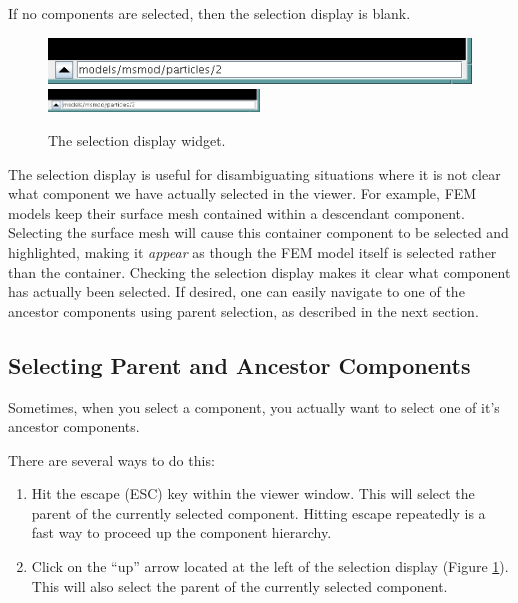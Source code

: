\documentclass{article}
\begin{document}
If no components are selected, then the selection display is blank.

\begin{figure}
\begin{center}
\iflatexml
\includegraphics[]{images/selectionDisplay}
\else
\includegraphics[width=0.50\textwidth]{images/selectionDisplay}
\fi
\end{center}
\caption{The selection display widget.}%
\label{selectionDisplayWidgetFig}
\end{figure}

The selection display is useful for disambiguating situations where it
is not clear what component we have actually selected in the viewer.
For example, FEM models keep their surface mesh contained within a
descendant component. Selecting the surface mesh will cause this
container component to be selected and highlighted, making it {\it
appear} as though the FEM model itself is selected rather than the
container. Checking the selection display makes it clear
what component has actually been selected. If desired,
one can easily navigate to one of the ancestor components
using parent selection, as described in the next section.

\subsection{Selecting Parent and Ancestor Components}
\label{selectingAncestorsSec}

Sometimes, when you select a component, you actually want to select
one of it's ancestor components. 

There are several ways to do this:

\begin{enumerate}

\item Hit the escape ({\sf ESC}) key within the viewer window. This
will select the parent of the currently selected component. Hitting
escape repeatedly is a fast way to proceed up the component hierarchy.

\item Click on the ``up'' arrow located at the left of the selection
display (Figure \ref{selectionDisplayWidgetFig}). This will also
select the parent of the currently selected component.

\end{enumerate}
\end{document}
